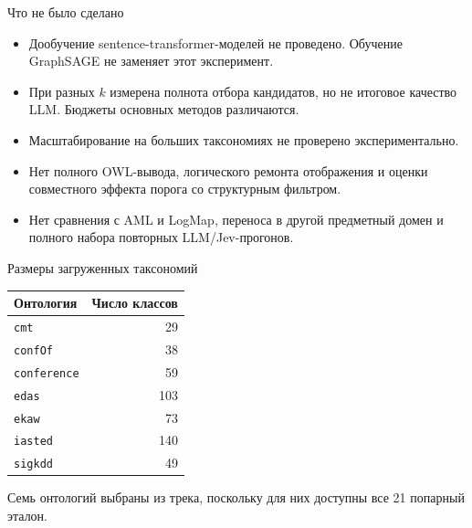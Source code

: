 \documentclass[aspectratio=169,11pt]{beamer}
\begin{document}
\renewcommand{\hseheadertext}{Дополнительные материалы}
\begin{frame}{Что не было сделано}
  \begin{itemize}
    \item Дообучение sentence-transformer-моделей не проведено.
      Обучение GraphSAGE не заменяет этот эксперимент.
    \item При разных $k$ измерена полнота отбора кандидатов,
      но не итоговое качество LLM. Бюджеты основных методов различаются.
    \item Масштабирование на больших таксономиях не проверено экспериментально.
    \item Нет полного OWL-вывода, логического ремонта отображения и оценки
      совместного эффекта порога со структурным фильтром.
    \item Нет сравнения с AML и LogMap, переноса в другой предметный домен
      и полного набора повторных LLM/Jev-прогонов.
  \end{itemize}
\end{frame}

\renewcommand{\hseheadertext}{Дополнительные материалы}
\begin{frame}{Размеры загруженных таксономий}
  \begin{center}
    \begin{tabular}{lr}
      \toprule
      Онтология & Число классов \\
      \midrule
      \texttt{cmt} & 29 \\
      \texttt{confOf} & 38 \\
      \texttt{conference} & 59 \\
      \texttt{edas} & 103 \\
      \texttt{ekaw} & 73 \\
      \texttt{iasted} & 140 \\
      \texttt{sigkdd} & 49 \\
      \bottomrule
    \end{tabular}
  \end{center}
  Семь онтологий выбраны из трека, поскольку для них доступны все 21 попарный эталон.
\end{frame}
\end{document}
